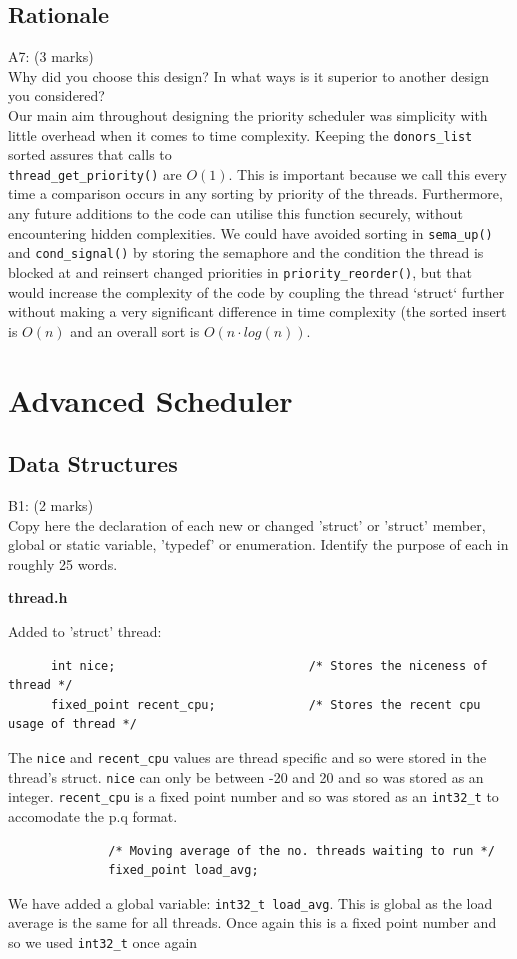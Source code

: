 \documentclass[11pt, a4paper]{article}
\begin{document}
	\subsection{Rationale}
		A7: (3 marks)\\
		Why did you choose this design? In what ways is it superior to another design you 
		considered?\bigskip\\
		Our main aim throughout designing the priority
		scheduler was simplicity with little overhead
		when it comes to time complexity. Keeping the
		\verb+donors_list+ sorted assures that calls to
		\\\verb+thread_get_priority()+ are $O(1)$. This is
		important because we call this every time a 
		comparison occurs in any sorting by priority
		of the threads. Furthermore, any future
		additions to the code can utilise this function
		securely, without encountering hidden complexities.
		We could have avoided sorting in \verb+sema_up()+
		and \verb+cond_signal()+ by storing the semaphore
		and the condition the thread is blocked at and
		reinsert changed priorities in
    \verb+priority_reorder()+, but that would increase
		the complexity of the code by coupling the
		thread `struct` further without making a 
		very significant difference in time complexity (the sorted
    insert is $O(n)$ and an overall sort is $O(n \cdot log(n))$.

\section{Advanced Scheduler}
	\subsection{Data Structures}
		B1: (2 marks)\\
		Copy here the declaration of each new or changed 'struct' or 'struct' member, global or 
		static variable, 'typedef' or enumeration. Identify the purpose of each in roughly 25 
		words.
    \begin{center}
      \textbf{thread.h}
    \end{center}
		Added to 'struct' thread:
		\begin{verbatim}
      int nice;                           /* Stores the niceness of thread */
      fixed_point recent_cpu;             /* Stores the recent cpu usage of thread */     
		\end{verbatim}
		The \verb+nice+ and \verb+recent_cpu+ values are thread specific and so were stored in the thread's struct. \verb+nice+ can only be between -20 and 20 and so was stored as an integer.
    \verb+recent_cpu+ is a fixed point number and so was stored as an \verb+int32_t+ to accomodate the p.q format.
		\begin{verbatim}
		      /* Moving average of the no. threads waiting to run */
		      fixed_point load_avg;
		\end{verbatim}
		We have added a global variable: \verb+int32_t load_avg+. This is global as the load average is the same for all threads. Once again this is a fixed point number and so we used \verb+int32_t+ once again
		
\end{document}
